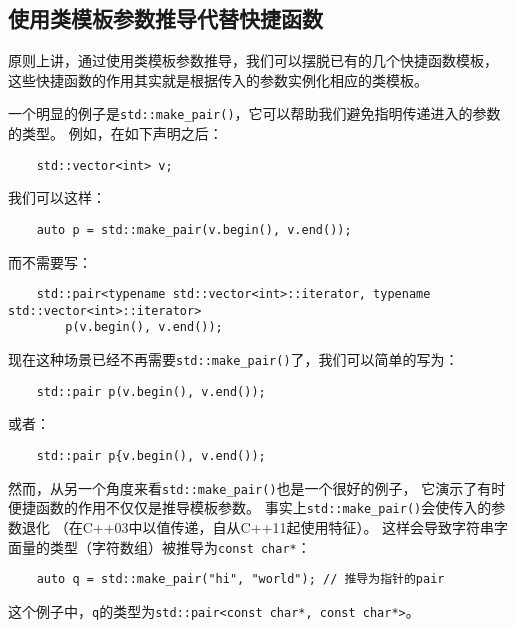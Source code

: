 \subsection{使用类模板参数推导代替快捷函数}\label{ch9.1.4}
原则上讲，通过使用类模板参数推导，我们可以摆脱已有的几个快捷函数模板，
这些快捷函数的作用其实就是根据传入的参数实例化相应的类模板。

一个明显的例子是\texttt{std::make\_pair()}，它可以帮助我们避免指明传递进入的参数的类型。
例如，在如下声明之后：
\begin{lstlisting}
    std::vector<int> v;
\end{lstlisting}
我们可以这样：
\begin{lstlisting}
    auto p = std::make_pair(v.begin(), v.end());
\end{lstlisting}
而不需要写：
\begin{lstlisting}
    std::pair<typename std::vector<int>::iterator, typename std::vector<int>::iterator>
        p(v.begin(), v.end());
\end{lstlisting}
现在这种场景已经不再需要\texttt{std::make\_pair()}了，我们可以简单的写为：
\begin{lstlisting}
    std::pair p(v.begin(), v.end());
\end{lstlisting}
或者：
\begin{lstlisting}
    std::pair p{v.begin(), v.end());
\end{lstlisting}

然而，从另一个角度来看\texttt{std::make\_pair()}也是一个很好的例子，
它演示了有时便捷函数的作用不仅仅是推导模板参数。
事实上\texttt{std::make\_pair()}会使传入的参数退化
（在C++03中以值传递，自从C++11起使用特征）。
这样会导致字符串字面量的类型（字符数组）被推导为\texttt{const char*}：
\begin{lstlisting}
    auto q = std::make_pair("hi", "world"); // 推导为指针的pair
\end{lstlisting}
这个例子中，\texttt{q}的类型为\texttt{std::pair<const char*, const char*>}。

